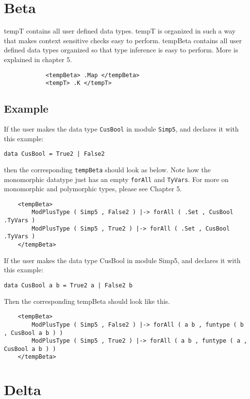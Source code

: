 \section{Beta}

tempT contains all user defined data types. tempT is organized in such a way that makes context sensitive checks easy to perform. tempBeta contains all user defined data types organized so that type inference is easy to perform. More is explained in chapter 5.
\begin{lstlisting}
            <tempBeta> .Map </tempBeta>
            <tempT> .K </tempT>
\end{lstlisting}

\subsection{Example}
If the user makes the data type \texttt{CusBool} in module \texttt{Simp5}, and declares it with this example:
\begin{lstlisting}
data CusBool = True2 | False2
\end{lstlisting}

then the corresponding \texttt{tempBeta} should look as below. Note how the monomorphic datatype just has an empty \texttt{forAll} and \texttt{TyVars}. For more on monomorphic and polymorphic types, please see Chapter 5.

\begin{lstlisting}
    <tempBeta>
        ModPlusType ( Simp5 , False2 ) |-> forAll ( .Set , CusBool .TyVars )
        ModPlusType ( Simp5 , True2 ) |-> forAll ( .Set , CusBool .TyVars )
    </tempBeta>
\end{lstlisting}

If the user makes the data type CusBool in module Simp5, and declares it with this example:
\begin{lstlisting}
data CusBool a b = True2 a | False2 b
\end{lstlisting}

Then the corresponding tempBeta should look like this.
\begin{lstlisting}
    <tempBeta>
        ModPlusType ( Simp5 , False2 ) |-> forAll ( a b , funtype ( b , CusBool a b ) )
        ModPlusType ( Simp5 , True2 ) |-> forAll ( a b , funtype ( a , CusBool a b ) )
    </tempBeta>

\end{lstlisting}

\section{Delta}

